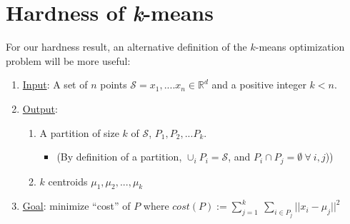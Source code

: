 \section{Hardness of \emph{k}-means}

For our hardness result, an alternative definition of the $k$-means
optimization problem will be more useful: 
\begin{enumerate}
\item \underline{Input}: A set of $n$ points $\mathcal{S} =
  x_1,....x_n \in \mathbb{R}^d$ and a positive integer $k<n$. 
\item \underline{Output}: 
\begin{enumerate}
\item A partition of size $k$ of $\mathcal{S}$, $P_1,P_2,...P_k$. 
\begin{itemize}
\item (By definition of a partition, $\cup_i P_i = \mathcal{S}$,  and $P_i \cap P_j = \emptyset \ \forall \ i, j$))
\end{itemize}
\item $k$ centroids $\mu_1,\mu_2,...,\mu_k$
\end{enumerate}
\item \underline{Goal}: minimize ``cost'' of $P$ where $cost(P) 
:=  \sum_{j=1}^{k} \ \sum_{i\in P_j} || x_i - \mu_j || ^2 $
 \end{enumerate}

